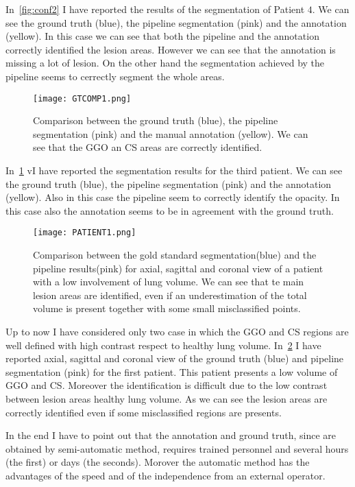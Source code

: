 \documentclass{standalone}
\begin{document}
 	In \figurename\,\ref{fig:conf2} I have reported the results of the segmentation of Patient $4$. We can see the ground truth (blue), the pipeline segmentation (pink) and the annotation (yellow). In this case we can see that both the pipeline and the annotation correctly identified the lesion areas. However we can see that the annotation is missing a lot of lesion. On the other hand the segmentation achieved by the pipeline seems to cerrectly segment the whole areas. 
 	
 	\begin{figure}[h!]
 		\texttt{[image: GTCOMP1.png]}
 		
 		\caption{Comparison between the ground truth (blue), the pipeline segmentation (pink) and the manual annotation (yellow). We can see that the GGO an CS areas are correctly identified.}\label{fig:conf1}
 	\end{figure}
 
 	In \figurename\,\ref{fig:conf1} vI have reported the segmentation results for the third patient. We can see the ground truth (blue), the pipeline segmentation (pink) and the annotation (yellow). Also in this case the pipeline seem to correctly identify the opacity. In this case also the annotation seems to be in agreement with the ground truth.
 	
 	\begin{figure}[h!]
 		\centering
 		\texttt{[image: PATIENT1.png]}  
 		\caption{Comparison between the gold standard segmentation(blue) and the pipeline results(pink) for axial, sagittal and coronal view of a patient with a low involvement of lung volume. We can see that te main lesion areas are identified, even if an underestimation of the total volume is present together with some small misclassified points.}\label{fig:pat1}
 	\end{figure}
 	
 	Up to now I have considered only two case in which the GGO and CS regions are well defined with high contrast respect to healthy lung volume. In \figurename\,\ref{fig:pat1} I have reported axial, sagittal and coronal view of the ground truth (blue) and pipeline segmentation (pink) for the first patient. This patient presents a low volume of GGO and CS. Moreover the identification is difficult due to the low contrast between lesion areas healthy lung volume. As we can see the lesion areas are correctly identified even if some misclassified regions are presents. 
 	
 	In the end I have to point out that the annotation and ground truth, since are obtained by semi-automatic method, requires  trained personnel and several hours (the first) or days (the seconds).  Morover the automatic method has the advantages of the speed and of the independence from an external operator.
 	
	
\end{document}

